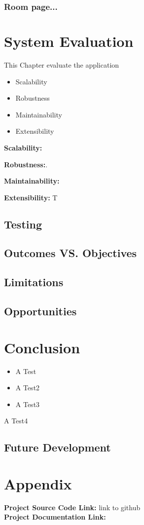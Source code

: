 \subsection{Room page...}


\chapter{System Evaluation}
This Chapter evaluate the application
\begin{itemize}
    \item Scalability
    \item Robustness
    \item Maintainability
    \item Extensibility
\end{itemize}

\par \textbf{Scalability:} 

\par \textbf{Robustness:}.

\par \textbf{Maintainability:}

\par \textbf{Extensibility:} T

\section{Testing}

\section{Outcomes VS. Objectives}

\section{Limitations}

\section{Opportunities}

\chapter{Conclusion}


\begin{itemize}
\item A Test

\item A Test2
\item A Test3
\end{itemize}
A Test4
\section{Future Development}

\chapter{Appendix}

\textbf{Project Source Code Link: }link to github \\
\textbf{Project Documentation Link: } \\

